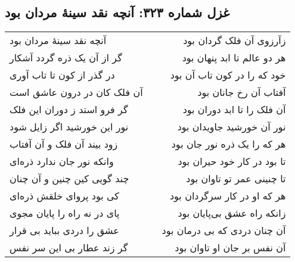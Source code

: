 \begin{center}
\section*{غزل شماره ۳۲۳: آنچه نقد سینهٔ مردان بود}
\label{sec:323}
\begin{longtable}{l p{0.5cm} r}
آنچه نقد سینهٔ مردان بود
&&
زآرزوی آن فلک گردان بود
\\
گر از آن یک ذره گردد آشکار
&&
هر دو عالم تا ابد پنهان بود
\\
در گذر از کون تا تاب آوری
&&
خود که را در کون تاب آن بود
\\
آن فلک کان در درون عاشق است
&&
آفتاب آن رخ جانان بود
\\
گر فرو استد ز دوران این فلک
&&
آن فلک را تا ابد دوران بود
\\
نور این خورشید اگر زایل شود
&&
نور آن خورشید جاویدان بود
\\
زود بیند آن فلک و آن آفتاب
&&
هر که را یک ذره نور جان بود
\\
وانکه نور جان ندارد ذره‌ای
&&
تا بود در کار خود حیران بود
\\
چند گویی کین چنین و آن چنان
&&
تا چنینی عمر تو تاوان بود
\\
کی بود پروای خلقش ذره‌ای
&&
هر که او در کار سرگردان بود
\\
پای در نه راه را پایان مجوی
&&
زانکه راه عشق بی‌پایان بود
\\
عشق را دردی بباید بی قرار
&&
آن چنان دردی که بی درمان بود
\\
گر زند عطار بی این سر نفس
&&
آن نفس بر جان او تاوان بود
\\
\end{longtable}
\end{center}
